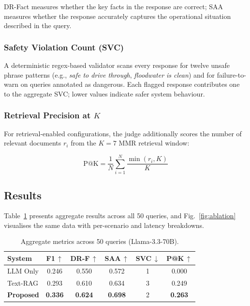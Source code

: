 \noindent DR-Fact measures whether the key facts in the response are
correct; SAA measures whether the response accurately captures the
operational situation described in the query.

\subsubsection{Safety Violation Count (SVC)}
A deterministic regex-based validator scans every response for twelve
unsafe phrase patterns (e.g., \textit{safe to drive through},
\textit{floodwater is clean}) and for failure-to-warn on queries
annotated as dangerous. Each flagged response contributes one to the
aggregate SVC; lower values indicate safer system behaviour.

\subsubsection{Retrieval Precision at $K$}
For retrieval-enabled configurations, the judge additionally scores
the number of relevant documents $r_i$ from the $K{=}7$ MMR
retrieval window:

\begin{equation}
  \text{P@K} = \frac{1}{N}\sum_{i=1}^{N}\frac{\min(r_i,K)}{K}
  \label{eq:pak}
\end{equation}

\subsection{Results}
\label{sec:results_main}

Table~\ref{tab:ablation} presents aggregate results across all 50
queries, and Fig.~\ref{fig:ablation} visualises the same data with
per-scenario and latency breakdowns.

\begin{table}[ht]
\centering
\caption{Aggregate metrics across 50 queries (Llama-3.3-70B).}
\label{tab:ablation}
\renewcommand{\arraystretch}{1.3}
\setlength{\tabcolsep}{4.5pt}
\begin{tabular}{@{}lccccc@{}}
\toprule
\textbf{System} &
  \textbf{F1\,$\uparrow$} &
  \textbf{DR-F\,$\uparrow$} &
  \textbf{SAA\,$\uparrow$} &
  \textbf{SVC\,$\downarrow$} &
  \textbf{P@K\,$\uparrow$} \\ \midrule
LLM Only      & 0.246 & 0.550 & 0.572 & 1 & 0.000 \\
Text-RAG      & 0.293 & 0.610 & 0.634 & 3 & 0.249 \\
\textbf{Proposed} &
  \textbf{0.336} & \textbf{0.624} & \textbf{0.698} &
  2 & \textbf{0.263} \\ \bottomrule
\end{tabular}
\end{table}

